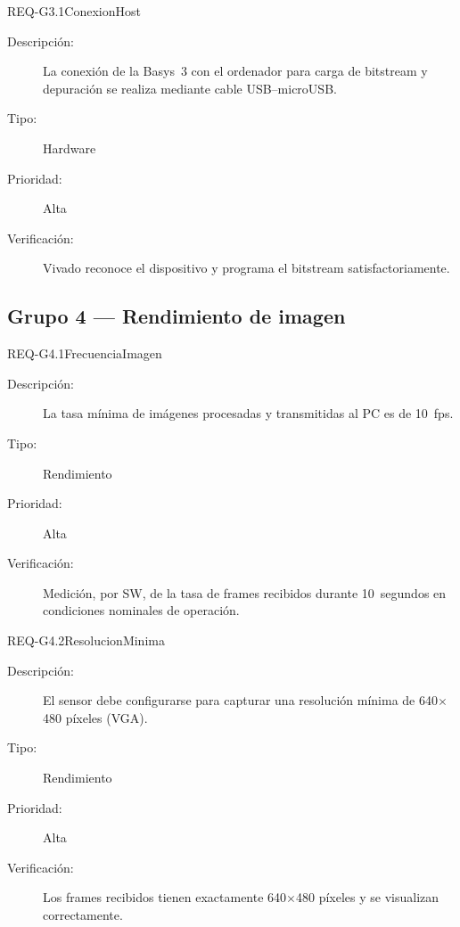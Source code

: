 \documentclass[../main.tex]{subfiles}
\begin{document}
\begin{requisito}{REQ-G3.1}{ConexionHost}
\begin{description}
    \item[Descripción:]   La conexión de la Basys~3 con el ordenador para carga de bitstream y depuración se realiza mediante cable USB--microUSB.
    \item[Tipo:]          Hardware
    \item[Prioridad:]     Alta
    \item[Verificación:]  Vivado reconoce el dispositivo y programa el bitstream satisfactoriamente.
\end{description}
\end{requisito}

\subsection{Grupo 4 — Rendimiento de imagen}

\begin{requisito}{REQ-G4.1}{FrecuenciaImagen}
\begin{description}
    \item[Descripción:]   La tasa mínima de imágenes procesadas y transmitidas al PC es de 10~fps.
    \item[Tipo:]          Rendimiento
    \item[Prioridad:]     Alta
    \item[Verificación:]  Medición, por \ac{SW}, de la tasa de frames recibidos durante 10~segundos en condiciones nominales de operación.
\end{description}
\end{requisito}

\begin{requisito}{REQ-G4.2}{ResolucionMinima}
\begin{description}
    \item[Descripción:]   El sensor debe configurarse para capturar una resolución mínima de 640$\times$480 píxeles (\ac{VGA}).
    \item[Tipo:]          Rendimiento
    \item[Prioridad:]     Alta
    \item[Verificación:]  Los frames recibidos tienen exactamente 640$\times$480 píxeles y se visualizan correctamente.
\end{description}
\end{requisito}
\end{document}
